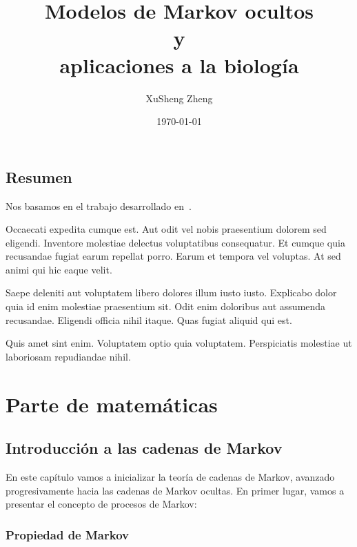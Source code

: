 \documentclass[oneside,openright,titlepage,numbers=noenddot,openany,headinclude,footinclude=true,
cleardoublepage=empty,abstractoff,BCOR=5mm,paper=a4,fontsize=12pt,main=spanish]{scrreprt}
\author{XuSheng Zheng}
\date{\today}
\title{Modelos de Markov ocultos\\ y \\aplicaciones a la biología}
\begin{document}
\maketitle
\tableofcontents


\chapter*{Resumen}


Nos basamos en el trabajo desarrollado en~\cite{turing1936a}.

Occaecati expedita cumque est. Aut odit vel nobis praesentium dolorem
sed eligendi. Inventore molestiae delectus voluptatibus
consequatur. Et cumque quia recusandae fugiat earum repellat
porro. Earum et tempora vel voluptas. At sed animi qui hic eaque
velit.

Saepe deleniti aut voluptatem libero dolores illum iusto
iusto. Explicabo dolor quia id enim molestiae praesentium sit. Odit
enim doloribus aut assumenda recusandae. Eligendi officia nihil
itaque. Quas fugiat aliquid qui est.

Quis amet sint enim. Voluptatem optio quia voluptatem. Perspiciatis
molestiae ut laboriosam repudiandae nihil.


\part{Parte de matemáticas}

\chapter{Introducción a las cadenas de Markov}

En este capítulo vamos a inicializar la teoría de cadenas de Markov, avanzado progresivamente hacia las cadenas de Markov ocultas. En primer lugar, vamos a presentar el concepto de procesos de Markov:

\section{Propiedad de Markov}
\end{document}
